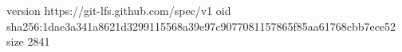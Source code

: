 version https://git-lfs.github.com/spec/v1
oid sha256:1dae3a341a8621d3299115568a39e97c9077081157865f85aa61768cbb7ece52
size 2841
